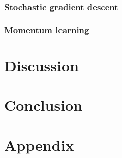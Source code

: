 \documentclass[12pt,a4paper]{article}
\begin{document}
\subsubsection{Stochastic gradient descent}
\subsubsection{Momentum learning}


\section{Discussion}


\section{Conclusion}


\newpage
\section{Appendix}
\end{document}
